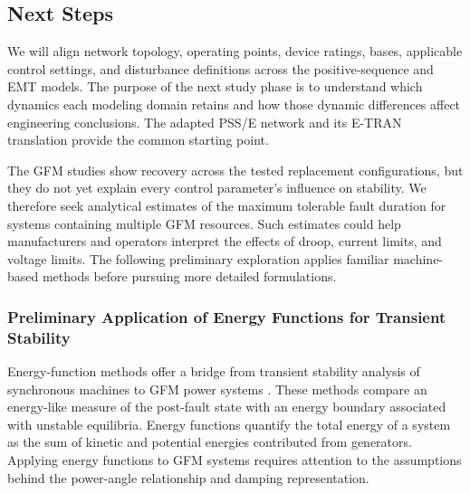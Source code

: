 \documentclass[11pt]{article}
\begin{document}
\subsection{Next Steps}
We will align network topology, operating points, device ratings, bases, applicable control settings, and disturbance definitions across the positive-sequence and EMT models. The purpose of the next study phase is to understand which dynamics each modeling domain retains and how those dynamic differences affect engineering conclusions. The adapted PSS/E network and its E-TRAN translation provide the common starting point.

The GFM studies show recovery across the tested replacement configurations, but they do not yet explain every control parameter's influence on stability. We therefore seek analytical estimates of the maximum tolerable fault duration for systems containing multiple GFM resources. Such estimates could help manufacturers and operators interpret the effects of droop, current limits, and voltage limits. The following preliminary exploration applies familiar machine-based methods before pursuing more detailed formulations.

\subsubsection{Preliminary Application of Energy Functions for Transient Stability}
\label{sec:energymethod}
Energy-function methods offer a bridge from transient stability analysis of synchronous machines to GFM power systems \cite{sauer1998,pai1989,athay1979,bergen1981,chiang1988}. These methods compare an energy-like measure of the post-fault state with an energy boundary associated with unstable equilibria. Energy functions quantify the total energy of a system as the sum of kinetic and potential energies contributed from generators.  Applying energy functions to GFM systems requires attention to the assumptions behind the power-angle relationship and damping representation.
\end{document}
